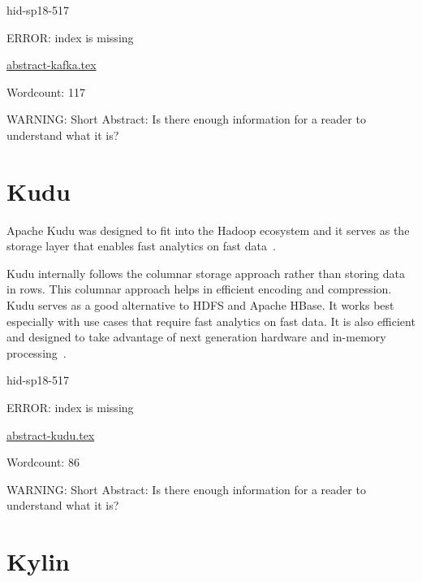 \begin{IU}

hid-sp18-517

ERROR: index is missing

\href{https://github.com/cloudmesh-community/hid-sp18-517/blob/master//technology/abstract-kafka.tex}{abstract-kafka.tex}

 

Wordcount: 117

WARNING: Short Abstract: Is there enough information for a reader to understand what it is?

\end{IU}

\section{Kudu}

Apache Kudu was designed to fit into the Hadoop ecosystem and it 
serves as the storage layer that enables fast analytics on fast 
data~\cite{hid-sp18-517-ApacheKudu}.

Kudu internally follows the columnar storage approach rather than 
storing data in rows. This columnar approach helps in efficient 
encoding and compression. Kudu serves as a good alternative to HDFS 
and Apache HBase. It works best especially with use cases that 
require fast analytics on fast data. It is also efficient and 
designed to take advantage of next generation hardware and 
in-memory processing~\cite{hid-sp18-517-ApacheKudu}.





\begin{IU}

hid-sp18-517

ERROR: index is missing

\href{https://github.com/cloudmesh-community/hid-sp18-517/blob/master//technology/abstract-kudu.tex}{abstract-kudu.tex}

 

Wordcount: 86

WARNING: Short Abstract: Is there enough information for a reader to understand what it is?

\end{IU}

\section{Kylin}

